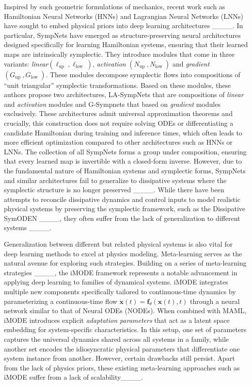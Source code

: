 Inspired by such geometric formulations of mechanics, recent work such as Hamiltonian Neural Networks (HNNs) and Lagrangian Neural Networks (LNNs) have sought to embed physical priors into deep learning architectures ____. In particular, SympNets have emerged as structure-preserving neural architectures designed specifically for learning Hamiltonian systems, ensuring that their learned maps are intrinsically symplectic. They introduce modules that come in three variants: \emph{linear}$\left(\ell_{\text {up }}, \ell_{\text {low }}\right)$,
\emph{activation} $\left(N_{\text {up }}, N_{\text {low }}\right)$ and \emph{gradient}
$\left(G_{\text {up }}, G_{\text {low }}\right)$. These modules decompose symplectic flows into compositions of “unit triangular” symplectic transformations. Based on these modules, these authors propose two architectures, LA-SympNets that are compositions of \emph{linear} and \emph{activation} modules and G-Sympnets that based on \emph{gradient} modules exclusively. These architectures admit universal approximation theorems and crucially, this construction does not require solving ODEs or differentiating a candidate Hamiltonian during training and inference times, which often leads to more efficient optimization compared to other architectures such as HNNs or LNNs. The collection of all SympNets forms a group under composition, ensuring that every learned map is invertible with a closed-form inverse. However, due to the fundamental nature of Hamiltonian systems and symplectic forms, SympNets and similar architectures fail to generalize to dissipative systems where the symplectic structure is no longer preserved ____. While there have been attempts to reconcile dissipative dynamics and control inputs to model realistic physical systems by preserving the symplectic framework, such as the Dissipative SymODEN ____,  they often suffer from the lack of generalization to different systems ____. 

Generalization between different but related physical systems is also vital for deep learning methods to excel at physics modeling. Meta-learning serves as the natural avenue for exploring such strategies. Building on a series of meta-learning strategies ____, the iMODE framework represents a notable advancement in applying deep learning to families of dynamical systems. iMODE integrates multiple new components specifically tailored to continuous-time dynamics by parameterizing a continuous-time flow 
 $\dot{\mathbf x}(t) = \mathbf f_\theta(\mathbf{\mathbf x}(t), t)$ through a neural network similar to that of Neural ODEs (NODEs). When combined with MAML, iMODE introduces explicit \emph{adaptation parameters} that act as a latent space embedding for system-specific characteristics. In this setup, one set of parameters captures the universal dynamics shared across all systems in a family, while another set encodes the idiosyncratic physical parameters that differentiate one system instance from another. However, certain drawbacks still persist. Apart from the lack of physics priors, these existing meta-learning approaches such as iMODE suffer from a lack of scalability____.  

